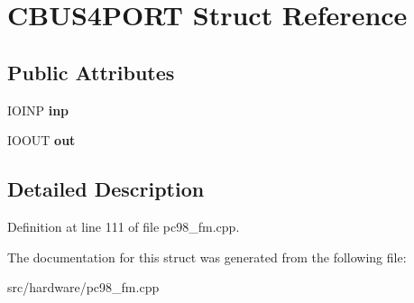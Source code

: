 \hypertarget{structCBUS4PORT}{\section{C\-B\-U\-S4\-P\-O\-R\-T Struct Reference}
\label{structCBUS4PORT}
}
\subsection*{Public Attributes}
\begin{DoxyCompactItemize}
\item 
\hypertarget{structCBUS4PORT_acdfa7680ca648b64bae4afc5b7ccf8a6}{I\-O\-I\-N\-P {\bfseries inp}}\label{structCBUS4PORT_acdfa7680ca648b64bae4afc5b7ccf8a6}

\item 
\hypertarget{structCBUS4PORT_ad38129fe2ce76c6bd2e1f1e6cd7948b3}{I\-O\-O\-U\-T {\bfseries out}}\label{structCBUS4PORT_ad38129fe2ce76c6bd2e1f1e6cd7948b3}

\end{DoxyCompactItemize}


\subsection{Detailed Description}


Definition at line 111 of file pc98\-\_\-fm.\-cpp.



The documentation for this struct was generated from the following file\-:\begin{DoxyCompactItemize}
\item 
src/hardware/pc98\-\_\-fm.\-cpp\end{DoxyCompactItemize}
